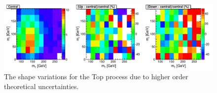 \begin{figure}[!hbtp]
\centering
\includegraphics[width=1.0\textwidth]{figures/Top_TopBounding_2D_mH125_0j_of.pdf}
\caption{ The shape variations for the Top process due to higher order theoretical uncertainties.}
\label{fig:top_shapevar_theory}
\end{figure}


